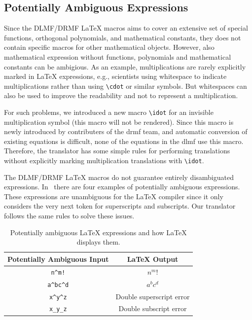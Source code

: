 \documentclass[a4paper,11pt]{article}
\newcommand{\DLMF}{DLMF}
\newcommand{\DRMF}{DRMF}
\newcommand{\Macro}{\DLMF/\DRMF{} \LaTeX{} macro}
\theoremstyle{defTheoStyle}
\theoremstyle{defExampStyle}
\begin{document}
	\subsection{Potentially Ambiguous Expressions}
	Since the \Macro s aims to cover an extensive set of special functions, orthogonal polynomials, and mathematical constants, they does not contain specific macros for other mathematical objects. However, also mathematical expression without functions, polynomials and mathematical constants can be ambigious. As an example, multiplications are rarely explicitly marked in \LaTeX{} expressions, e.g., scientists using whitespace to indicate multiplications rather than using \verb|\cdot| or similar symbols. But whitespaces can also be used to improve the readability and not to represent a multiplication.
	
	For such problems, we introduced a new macro \verb|\idot| for an invisible multiplication symbol (this macro will not be rendered). Since this macro is newly introduced by contributers of the \gls*{drmf} team, and automatic conversion of existing equations is difficult, none of the equations in the \gls*{dlmf} use this macro. Therefore, the translator has some simple 
	rules for performing translations without explicitly marking multiplication translations with \verb|\idot|.
	
	The \Macro s do not guarantee entirely disambiguated expressions. In~ there are four examples of potentially ambiguous expressions. These expressions are unambiguous for the \LaTeX{} compiler since it only considers the very next token for superscripts and subscripts. Our translator follows the same rules to solve these issues.
	
	\begin{table}[ht]
		\centering
		\begin{tabular}{cc}
			\hline
			Potentially Ambiguous Input & \LaTeX{} Output\\
			\hline
			\verb|n^m!| & $n^m!$\\
			\verb|a^bc^d| & $a^bc^d$\\
			\verb|x^y^z| & Double superscript error\\
			\verb|x_y_z| & Double subscript error\\
			\hline
		\end{tabular}
		\caption{Potentially ambiguous \LaTeX{} expressions and how \LaTeX{} displays them.}
		\label{tab:amb-latex}
	\end{table}
	
\end{document}

